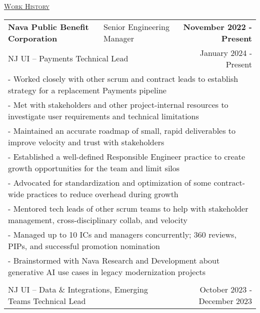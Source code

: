 \documentclass[letterpaper]{article}
\begin{document}
	\begin{center}
		\vspace{0.0in}
		\underline{\large \scshape Work History}
		\begin{tabular}{p{}p{}r}
			  \textbf{Nava Public Benefit Corporation} &
			  \quad\quad\quad Senior Engineering Manager &
			  \textbf{November 2022 - Present\quad}

			  \\
			  \multicolumn{2}{p{0.5\textwidth}}{\quad NJ UI -- Payments Technical Lead}
			  &
			  {January 2024 - Present \quad\quad\quad\quad}
		  \\
			  \multicolumn{3}{p{\textwidth}}{\quad\quad - Worked closely with other scrum and contract leads to establish strategy for a replacement Payments pipeline} \\
			  \multicolumn{3}{p{\textwidth}}{\quad\quad - Met with stakeholders and other project-internal resources to investigate user requirements and technical limitations} \\
			  \multicolumn{3}{p{\textwidth}}{\quad\quad - Maintained an accurate roadmap of small, rapid deliverables to improve velocity and trust with stakeholders} \\
			  \multicolumn{3}{p{\textwidth}}{\quad\quad - Established a well-defined Responsible Engineer practice to create growth opportunities for the team and limit silos} \\
			  \multicolumn{3}{p{\textwidth}}{\quad\quad - Advocated for standardization and optimization of some contract-wide practices to reduce overhead during growth} \\
			  \multicolumn{3}{p{\textwidth}}{\quad\quad - Mentored tech leads of other scrum teams to help with stakeholder management, cross-disciplinary collab, and velocity } \\
			  \multicolumn{3}{p{\textwidth}}{\quad\quad - Managed up to 10 ICs and managers concurrently; 360 reviews, PIPs, and successful promotion nomination } \\
			  \multicolumn{3}{p{\textwidth}}{\quad\quad - Brainstormed with Nava Research and Development about generative AI use cases in legacy modernization projects} 
		  \\
		  \\
			  \multicolumn{2}{p{0.5\textwidth}}{\quad NJ UI -- Data \& Integrations, Emerging Teams Technical Lead}
			  &
			  {October 2023 - December 2023 \quad\quad\quad\quad}
		  \\

\end{tabular}
\end{center}
\end{document}
